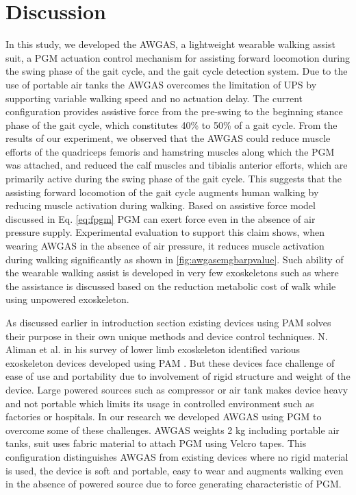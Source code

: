 \documentclass[paper,JRM,paper]{jaciiiarticle}
\begin{document}
\section{Discussion}
In this study, we developed the AWGAS, a lightweight wearable walking assist suit, a PGM actuation control mechanism for assisting forward locomotion during the swing phase of the gait cycle, and the gait cycle detection system. Due to the use of portable air tanks the AWGAS overcomes the limitation of UPS by supporting variable walking speed and no actuation delay. The current configuration provides assistive force from the pre-swing to the beginning stance phase of the gait cycle, which constitutes 40\% to 50\% of a gait cycle. From the results of our experiment, we observed that the AWGAS could reduce muscle efforts of the quadriceps femoris and hamstring muscles along which the PGM was attached, and reduced the calf muscles and tibialis anterior efforts, which are primarily active during the swing phase of the gait cycle. This suggests that the assisting forward locomotion of the gait cycle augments human walking by reducing muscle activation during walking. Based on assistive force model discussed in Eq. \ref{eq:fpgm} PGM can exert force even in the absence of air pressure supply. Experimental evaluation to support this claim shows, when wearing AWGAS in the absence of air pressure, it reduces muscle activation during walking significantly as shown in \ref{fig:awgasemgbarpvalue}. Such ability of the wearable walking assist is developed in very few exoskeletons such as \cite{23} where the assistance is discussed based on the reduction metabolic cost of walk while using unpowered exoskeleton. 

As discussed earlier in introduction section existing devices using PAM solves their purpose in their own unique methods and device control techniques. N. Aliman et al. in his survey of lower limb exoskeleton identified various exoskeleton devices developed using PAM \cite{24}. But these devices face challenge of ease of use and portability due to involvement of rigid structure and weight of the device. Large powered sources such as compressor or air tank makes device heavy and not portable which limits its usage in controlled environment such as factories or hospitals. In our research we developed AWGAS using PGM to overcome some of these challenges. AWGAS weights 2 kg including portable air tanks, suit uses fabric material to attach PGM using Velcro tapes. This configuration distinguishes AWGAS from existing devices where no rigid material is used, the device is soft and portable, easy to wear and augments walking even in the absence of powered source due to force generating characteristic of PGM. 
\end{document}
